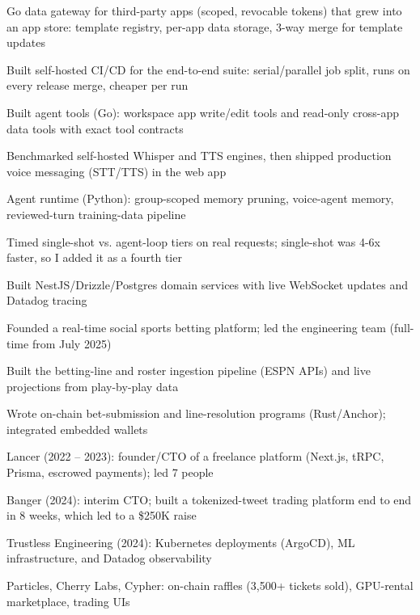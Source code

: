 \documentclass[print]{jack-resume}
\begin{document}
\begin{tightemize}
    \item Go data gateway for third-party apps (scoped, revocable tokens) that grew into an app store: template registry, per-app data storage, 3-way merge for template updates
    \item Built self-hosted CI/CD for the end-to-end suite: serial/parallel job split, runs on every release merge, cheaper per run
    \item Built agent tools (Go): workspace app write/edit tools and read-only cross-app data tools with exact tool contracts
    \item Benchmarked self-hosted Whisper and TTS engines, then shipped production voice messaging (STT/TTS) in the web app
    \item Agent runtime (Python): group-scoped memory pruning, voice-agent memory, reviewed-turn training-data pipeline
    \item Timed single-shot vs. agent-loop tiers on real requests; single-shot was 4-6x faster, so I added it as a fourth tier
\end{tightemize}
\sectionsep

\begin{tightemize}
    \item Built NestJS/Drizzle/Postgres domain services with live WebSocket updates and Datadog tracing
    \item Founded a real-time social sports betting platform; led the engineering team (full-time from July 2025)
    \item Built the betting-line and roster ingestion pipeline (ESPN APIs) and live projections from play-by-play data
    \item Wrote on-chain bet-submission and line-resolution programs (Rust/Anchor); integrated embedded wallets
\end{tightemize}
\sectionsep

\begin{tightemize}
    \item Lancer (2022 – 2023): founder/CTO of a freelance platform (Next.js, tRPC, Prisma, escrowed payments); led 7 people
    \item Banger (2024): interim CTO; built a tokenized-tweet trading platform end to end in 8 weeks, which led to a \$250K raise
    \item Trustless Engineering (2024): Kubernetes deployments (ArgoCD), ML infrastructure, and Datadog observability
    \item Particles, Cherry Labs, Cypher: on-chain raffles (3,500+ tickets sold), GPU-rental marketplace, trading UIs
\end{tightemize}
\sectionsep
\end{document}
